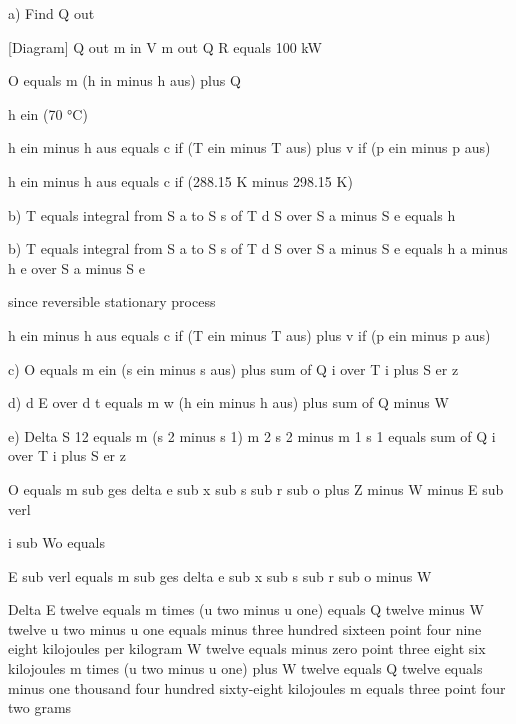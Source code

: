 a) Find Q out

[Diagram]
Q out
m in
V
m out
Q R equals 100 kW

O equals m (h in minus h aus) plus Q

h ein (70 °C)

h ein minus h aus equals c if (T ein minus T aus) plus v if (p ein minus p aus)

h ein minus h aus equals c if (288.15 K minus 298.15 K)

b) T equals integral from S a to S s of T d S over S a minus S e equals h

b) T equals integral from S a to S s of T d S over S a minus S e equals h a minus h e over S a minus S e

since reversible stationary process

h ein minus h aus equals c if (T ein minus T aus) plus v if (p ein minus p aus)

c) O equals m ein (s ein minus s aus) plus sum of Q i over T i plus S er z

d) d E over d t equals m w (h ein minus h aus) plus sum of Q minus W

e) Delta S 12 equals m (s 2 minus s 1) m 2 s 2 minus m 1 s 1 equals sum of Q i over T i plus S er z

O equals m sub ges delta e sub x sub s sub r sub o plus Z minus W minus E sub verl

i sub Wo equals

E sub verl equals m sub ges delta e sub x sub s sub r sub o minus W

Delta E twelve equals m times (u two minus u one) equals Q twelve minus W twelve  
u two minus u one equals minus three hundred sixteen point four nine eight kilojoules per kilogram  
W twelve equals minus zero point three eight six kilojoules  
m times (u two minus u one) plus W twelve equals Q twelve equals minus one thousand four hundred sixty-eight kilojoules  
m equals three point four two grams